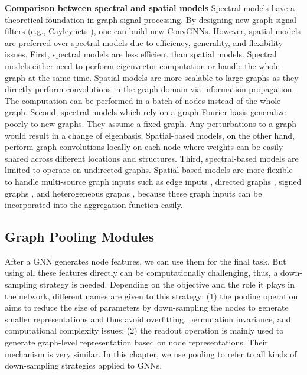     \vspace{2mm}
	\noindent\textbf{Comparison between spectral and spatial models}
    Spectral models have a theoretical foundation in graph signal processing. By designing new graph signal filters (e.g., Cayleynets \cite{levie2017cayleynets}), one can build new ConvGNNs. However, spatial models are preferred over spectral models due to efficiency, generality, and flexibility issues.
	First, spectral models are less efficient than spatial models. Spectral models either need to perform eigenvector computation or handle the whole graph at the same time.
	Spatial models are more scalable to large graphs as they directly perform convolutions in the graph domain via information propagation. The computation can be performed in a batch of nodes instead of the whole graph. 
    Second, spectral models which rely on a graph Fourier basis generalize poorly to new graphs. They assume a fixed graph. Any perturbations to a graph would result in a change of eigenbasis.
    Spatial-based models, on the other hand, perform graph convolutions locally on each node where weights can be easily shared across different locations and structures.  
	Third, spectral-based models are limited to operate on undirected graphs. 
	Spatial-based models are more flexible to handle multi-source graph inputs such as edge inputs \cite{scarselli2009graph,gilmer2017neural,kearnes2016molecular,pham2017column,simonovsky2017dynamic}, directed graphs \cite{atwood2016diffusion,li2018diffusion}, signed graphs \cite{derr2018signed}, and heterogeneous graphs \cite{such2017robust,wang2019heter}, because these graph inputs can be incorporated into the aggregation function easily.
	
    \subsection{Graph Pooling Modules}
    \label{sec:pooling}
    
    After a GNN generates node features, we can use them for the final task. But using all these features directly can be computationally challenging, thus, a down-sampling strategy is needed. Depending on the objective and the role it plays in the network, different names are given to this strategy: (1) the pooling operation aims to reduce the size of parameters by down-sampling the nodes to generate smaller representations and thus avoid overfitting, permutation invariance, and computational complexity issues; (2) the readout operation is mainly used to generate graph-level representation based on node representations. Their mechanism is very similar. In this chapter, we use pooling to refer to all kinds of down-sampling strategies applied to GNNs.
    
